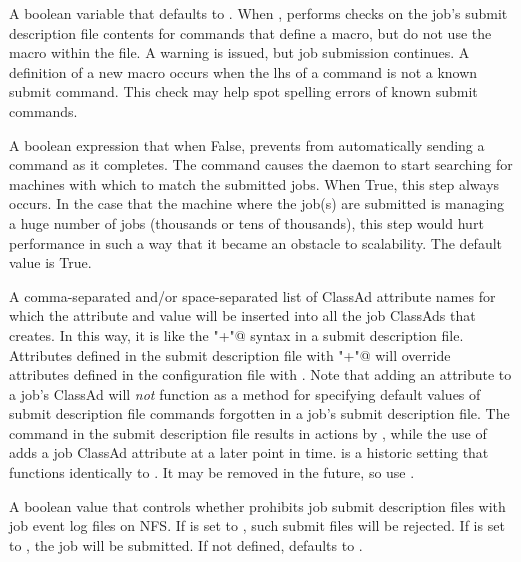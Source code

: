 \begin{description}
\label{param:WarnOnUnusedSubmitFileMacros}
\item[\Macro{WARN\_ON\_UNUSED\_SUBMIT\_FILE\_MACROS}]
  A boolean variable that defaults to .
  When , 
  performs checks on the job's submit description file contents
  for commands that define a macro, but do not use the macro within
  the file.
  A warning is issued, but job submission continues.
  A definition of a new macro occurs when the lhs of a command is not
  a known submit command.  This check may help spot spelling errors
  of known submit commands.

\label{param:SubmitSendReschedule}
\item[\Macro{SUBMIT\_SEND\_RESCHEDULE}]
  A boolean expression that when False, prevents  from
  automatically sending a  command as it completes.
  The  command causes the  daemon
  to start searching for machines with which to match the submitted
  jobs.  When True, this step always occurs.
  In the case that the machine where the job(s) are submitted is
  managing a huge number of jobs (thousands or tens of thousands),
  this step would hurt performance in such a way that it became
  an obstacle to scalability.
  The default value is True.

\label{param:SubmitAttrs}
\item[\Macro{SUBMIT\_ATTRS}]
  A comma-separated and/or space-separated 
  list of ClassAd attribute names for which the attribute and value will
  be inserted into all the job ClassAds that  creates.  
  In this way,
  it is like the \verb@"+"@ syntax in a submit description file.
  Attributes defined in the submit description file with \verb@"+"@ will
  override attributes defined in the configuration file with
  . 
  Note that adding an attribute to a job's ClassAd will \emph{not} function
  as a method for specifying default values of submit description file commands
  forgotten in a job's submit description file.
  The command in the submit description file results in actions by
  ,
  while the use of  adds a job ClassAd attribute
  at a later point in time.
   is a historic setting that functions identically to
  . It may be removed in the future, so use .

\label{param:LogOnNfsIsError}
\item[\Macro{LOG\_ON\_NFS\_IS\_ERROR}]
  A boolean value that controls whether  prohibits
  job submit description files with job event log files on NFS.  If
   is set to , such
  submit files will be rejected.  If 
  is set to ,
  the job will be submitted.  If not defined,
   defaults to .


\end{description}
